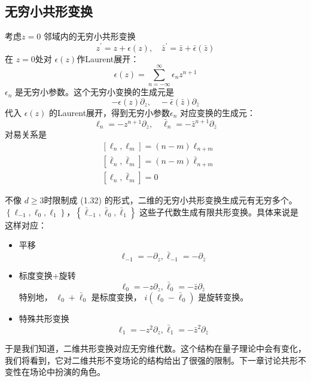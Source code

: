 \subsection{无穷小共形变换}
考虑$ z=0$ 邻域内的无穷小共形变换
\begin{equation}
		z^{\prime}=z+\epsilon(z), \quad \bar{z}^{\prime}=\bar{z}+\bar{\epsilon}(\bar{z})
\end{equation}
在 $z=0 $处对 $\epsilon(z) $作Laurent展开：
\begin{equation}
	\epsilon(z)=\sum_{n=-\infty}^{\infty} \epsilon_{n} z^{n+1}
\end{equation}
$\epsilon_n$ 是无穷小参数。这个无穷小变换的生成元是
\begin{equation}
	-\epsilon(z) \partial_{z}, \quad-\bar{\epsilon}(\bar{z}) \partial_{\bar{z}}
\end{equation}
代入 $\epsilon(z)$ 的Laurent展开，得到无穷小参数$ \epsilon_n$ 对应变换的生成元：
\begin{equation}
	\ell_{n}=-z^{n+1} \partial_{z}, \quad \bar{\ell}_{n}=-\bar{z}^{n+1} \partial_{\bar{z}}
\end{equation}
对易关系是
\begin{align} &\left[\ell_{n}, \ell_{m}\right]=(n-m) \ell_{n+m} \\ &\left[\bar{\ell}_{n}, \bar{\ell}_{m}\right]=(n-m) \bar{\ell}_{n+m} \\ &\left[\ell_{n}, \bar{\ell}_{m}\right]=0  \end{align}

不像 $d\geq 3 $时限制成 (1.32) 的形式，二维的无穷小共形变换生成元有无穷多个。$\left\{\ell_{-1}, \ell_{0}, \ell_{1}\right\} ， \left\{\bar{\ell}_{-1}, \bar{\ell}_{0}, \bar{\ell}_{1}\right\}$ 这些子代数生成有限共形变换。具体来说是这样对应：
\begin{itemize}
	\item 平移
	\[\ell_{-1}=-\partial_{z}, \bar{\ell}_{-1}=-\partial_{\bar{z}}\]
	\item{标度变换+旋转}
	\[\ell_{0}=-z \partial_{z}, \bar{\ell}_{0}=-\bar{z} \partial_{\bar{z}}\]
	特别地， $\ell_{0}+\bar{\ell}_{0}$ 是标度变换， $i\left(\ell_{0}-\bar{\ell}_{0}\right)$ 是旋转变换。
	\item 特殊共形变换
	\[\ell_{1}=-z^{2} \partial_{z}, \bar{\ell}_{1}=-\bar{z}^{2} \partial_{\bar{z}}
	\]
\end{itemize}

于是我们知道，二维共形变换对应无穷维代数。这个结构在量子理论中会有变化，我们将看到，它对二维共形不变场论的结构给出了很强的限制。下一章讨论共形不变性在场论中扮演的角色。


